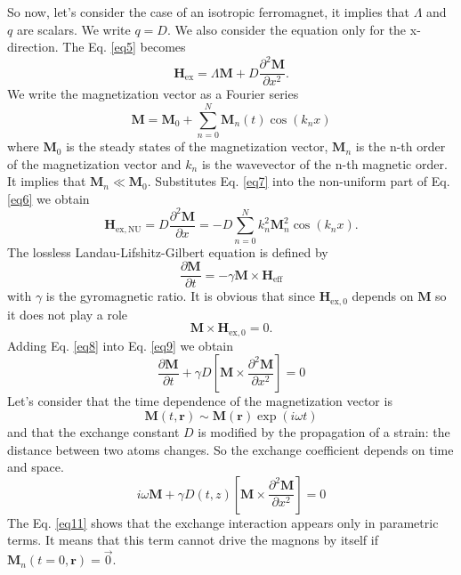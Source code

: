 \documentclass[12pt,a4paper]{article}
\begin{document}
So now, let's consider the case of an isotropic ferromagnet, it implies that $\Lambda$ and $q$ are scalars.
We write $q = D$.
We also consider the equation only for the x-direction.
The Eq. \eqref{eq5} becomes
\begin{equation}
    \mathbf{H}_{\mathrm{ex}} = \Lambda \mathbf{M} + D \frac{\partial^2 \mathbf{M}}{\partial x^2}.
    \label{eq6}
\end{equation}
We write the magnetization vector as a Fourier series
\begin{equation}
    \mathbf{M} = \mathbf{M}_0 + \sum_{n=0}^N \mathbf{M}_n \left( t \right) \cos \left( k_n x\right)
    \label{eq7}
\end{equation}
where $\mathbf{M}_0$ is the steady states of the magnetization vector, $\mathbf{M}_n$ is the n-th order of the magnetization vector and $k_n$ is the wavevector of the n-th magnetic order.
It implies that $\mathbf{M}_n \ll \mathbf{M}_0$.
Substitutes Eq. \eqref{eq7} into the non-uniform part of Eq. \eqref{eq6} we obtain 
\begin{equation}
    \mathbf{H}_{\mathrm{ex,NU}} =  D \frac{\partial^2 \mathbf{M}}{\partial x} = - D \sum_{n=0}^N k^2_n \mathbf{M}_n^2 \cos \left( k_n x\right).
    \label{eq8}
\end{equation}
The lossless Landau-Lifshitz-Gilbert equation is defined by
\begin{equation}
    \frac{\partial \mathbf{M}}{\partial t} = - \gamma \mathbf{M} \times \mathbf{H}_{\mathrm{eff}}
    \label{eq9}
\end{equation}
with $\gamma$ is the gyromagnetic ratio.
It is obvious that since $\mathbf{H}_{\mathrm{ex,0}}$ depends on $\textbf{M}$ so it does not play a role $$\mathbf{M} \times \mathbf{H}_{\mathrm{ex,0}} =0.$$
Adding Eq. \eqref{eq8} into Eq. \ref{eq9} we obtain
\begin{equation}
    \frac{\partial \mathbf{M}}{\partial t} + \gamma D \left[ \mathbf{M} \times \frac{\partial^2 \mathbf{M}}{\partial x^2} \right] = 0
    \label{eq10}
\end{equation}
Let's consider that the time dependence of the magnetization vector is $$\mathbf{M} \left(t, \mathbf{r} \right) \sim \mathbf{M} \left( \mathbf{r} \right) \exp \left( i \omega t \right)$$ and that the exchange constant $D$ is modified by the propagation of a strain: the distance between two atoms changes.
So the exchange coefficient depends on time and space.
\begin{equation}
    i \omega \mathbf{M} + \gamma D \left( t, z \right) \left[ \mathbf{M} \times \frac{\partial^2 \mathbf{M}}{\partial x^2} \right] = 0
    \label{eq11}
\end{equation}
The Eq. \eqref{eq11} shows that the exchange interaction appears only in parametric terms.
It means that this term cannot drive the magnons by itself if $\mathbf{M}_n \left( t = 0, \mathbf{r} \right) = \overrightarrow{0}$.
\end{document}

